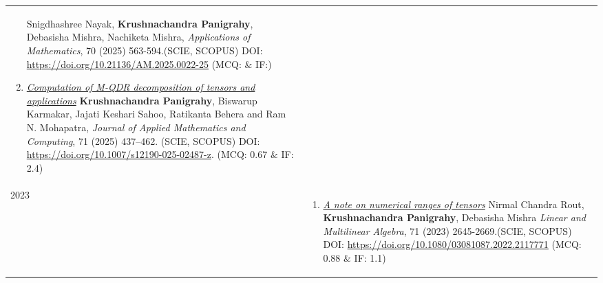 \documentclass[a4paper,12pt]{article}
\begin{document}
\begin{longtable}{lp{15cm}}
\begin{enumerate}[resume=pubs]
{\footnotesize
Snigdhashree Nayak, {\bf Krushnachandra Panigrahy}, Debasisha Mishra, Nachiketa Mishra,\newline
\textcolor{source}{\it Applications of Mathematics}, 70 (2025) 563-594.\hfill{(SCIE, SCOPUS)} \newline
DOI: \href{https://doi.org/10.21136/AM.2025.0022-25}{https://doi.org/10.21136/AM.2025.0022-25} \hfill(MCQ:  $\&$ IF:)
}
\item \href{https://doi.org/10.1007/s12190-025-02487-z}{\it Computation of M-QDR decomposition of tensors and applications}\newline
{\footnotesize
{\bf Krushnachandra Panigrahy}, Biswarup Karmakar, 
Jajati Keshari Sahoo, Ratikanta Behera and Ram N. Mohapatra, \newline
\textcolor{source}{\it Journal of Applied Mathematics and Computing}, 71 (2025) 437–462. \hfill{(SCIE, SCOPUS)}\newline
DOI: \href{https://doi.org/10.1007/s12190-025-02487-z}{https://doi.org/10.1007/s12190-025-02487-z}. \hfill(MCQ: 0.67 $\&$ IF: 2.4)
}
\end{enumerate}\\
\textsc{2023}&
\vspace{-0.3cm}
\begin{enumerate}[resume=pubs]
\item \href{https://doi.org/10.1080/03081087.2022.2117771}{\it A note on numerical ranges of tensors}\newline
{\footnotesize
Nirmal Chandra Rout, {\bf Krushnachandra Panigrahy}, Debasisha Mishra \newline
\textcolor{source}{\it Linear and Multilinear Algebra}, 71 (2023) 2645-2669.\hfill{(SCIE, SCOPUS)} \newline
DOI: \href{https://doi.org/10.1080/03081087.2022.2117771}{https://doi.org/10.1080/03081087.2022.2117771} \hfill(MCQ: 0.88 $\&$ IF: 1.1)
}


\end{enumerate}
\end{longtable}
\end{document}
